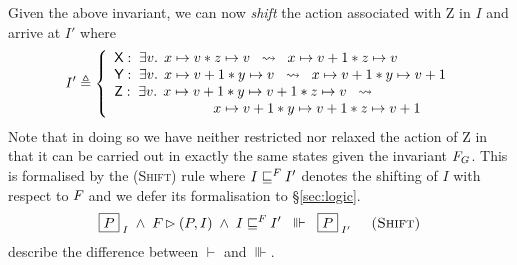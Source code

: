 Given the above invariant, we can now \emph{shift} the action associated with \textsf{Z} in $I$ and arrive at $I'$ where
%
\[
	I' \triangleq \left\{
		\begin{array}{l}
			\textsf{X}:\; \exists v.\,\; x \mapsto v * z \mapsto v  \hspace*{0.2cm}\rightsquigarrow\hspace*{0.2cm}  x \mapsto v+1 * z \mapsto v\\
			\textsf{Y}:\; \exists v.\,\; x \mapsto v+1 * y \mapsto v  \hspace*{0.2cm}\rightsquigarrow\hspace*{0.2cm}  x \mapsto v+1 * y \mapsto v+1\\
			\textsf{Z}:\; \exists v.\,\; x \mapsto v+1 *  y \mapsto v+1 * z \mapsto v\hspace*{0.2cm}\rightsquigarrow\\
			\hspace*{2.5cm} x \mapsto v+1 * y \mapsto v+1 * z \mapsto v+1\\
		\end{array}			
	\right.
\]
%
Note that in doing so we have neither restricted nor relaxed the action of \textsf{Z} in that it can be carried out in exactly the same states given the invariant $F_{G}$. This is formalised by the \textsc{(Shift)} rule where $I \sqsubseteq^{F_{}} I'$ denotes the shifting of $I$ with respect to $F_{}$ and we defer its formalisation to \S\ref{sec:logic}.
%
\[
	\boxed{P}_{\; I} \;\land\; F_{} \rhd (P, I) \;\land\; I \sqsubseteq^{F_{}} I' \hspace*{0.2cm}\Vvdash\hspace*{0.2cm} \boxed{P}_{\; I'} \hspace*{0.5cm} \textsc{(Shift)}
\]
%
\todo describe the difference between $\vdash$ and $\Vvdash$.\\


